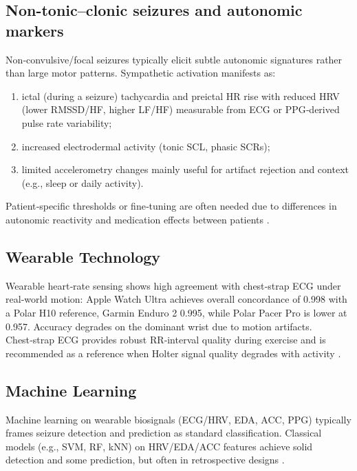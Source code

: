 \subsection{Non-tonic–clonic seizures and autonomic markers}
Non‑convulsive/focal seizures typically elicit subtle autonomic signatures
rather than large motor patterns. Sympathetic activation manifests as:
\begin{enumerate}
    \item ictal (during a seizure) tachycardia and preictal HR rise with reduced
    HRV (lower RMSSD/HF, higher LF/HF) measurable from ECG or PPG‑derived
    pulse rate variability;
    \item increased electrodermal activity (tonic SCL, phasic SCRs);
    \item limited accelerometry changes mainly useful for artifact rejection and
    context (e.g., sleep or daily activity).
\end{enumerate}
Patient‑specific thresholds or fine‑tuning are often needed due to differences in autonomic
reactivity and medication effects between patients \parencite{sethFeasibilityCardiacbasedSeizure2023,masonHeartRateVariability2024}.

\subsection{Wearable Technology}
Wearable heart‑rate sensing shows high agreement with chest‑strap ECG under real‑world motion: Apple Watch Ultra achieves overall concordance of 0.998 with a Polar H10 reference, Garmin Enduro 2 0.995, while Polar Pacer Pro is lower at 0.957.
Accuracy degrades on the dominant wrist due to motion artifacts.
Chest‑strap ECG provides robust RR‑interval quality during exercise and is recommended as a reference when Holter signal quality degrades with activity \parencite{wolfHearttoWearAssessingAccuracy2024a}.

\subsection{Machine Learning}

Machine learning on wearable biosignals (ECG/HRV, EDA, ACC, PPG) typically frames seizure detection
and prediction as standard classification. Classical models (e.g., SVM, RF, kNN) on HRV/EDA/ACC features
achieve solid detection and some prediction, but often in retrospective designs
\parencite{sethFeasibilityCardiacbasedSeizure2023,masonHeartRateVariability2024}.

